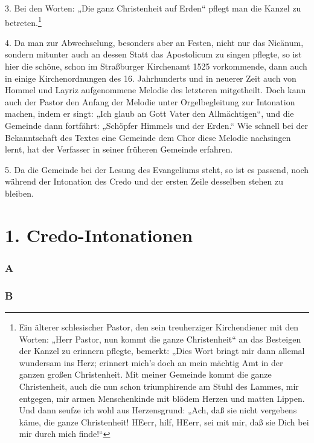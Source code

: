 3. Bei den Worten: „Die ganz Christenheit auf Erden“ pflegt man die Kanzel zu betreten.\footnote{Ein älterer schlesischer Pastor, den sein treuherziger Kirchendiener mit den Worten: „Herr Pastor, nun kommt die ganze Christenheit“ an das Besteigen der Kanzel zu erinnern pflegte, bemerkt: „Dies Wort bringt mir dann allemal wundersam ins Herz; erinnert mich’s doch an mein mächtig Amt in der ganzen großen Christenheit. Mit meiner Gemeinde kommt die ganze Christenheit, auch die nun schon triumphirende am Stuhl des Lammes, mir entgegen, mir armen Menschenkinde mit blödem Herzen und matten Lippen. Und dann seufze ich wohl aus Herzensgrund: „Ach, daß sie nicht vergebens käme, die ganze Christenheit! HEerr, hilf, HEerr, sei mit mir, daß sie Dich bei mir durch mich finde!“}

4. Da man zur Abwechselung, besonders aber an Festen, nicht nur das Nicänum, sondern mitunter auch an dessen Statt das Apostolicum zu singen pflegte, so ist hier die schöne, schon im Straßburger Kirchenamt 1525 vorkommende, dann auch in einige Kirchenordnungen des 16. Jahrhunderts und in neuerer Zeit auch von Hommel und Layriz aufgenommene Melodie des letzteren mitgetheilt. Doch kann auch der Pastor den Anfang der Melodie unter Orgelbegleitung zur Intonation machen, indem er singt: „Ich glaub an Gott Vater den Allmächtigen“, und die Gemeinde dann fortfährt: „Schöpfer Himmels und der Erden.“ Wie schnell bei der Bekanntschaft des Textes eine Gemeinde dem Chor diese Melodie nachsingen lernt, hat der Verfasser in seiner früheren Gemeinde erfahren.

5. Da die Gemeinde bei der Lesung des Evangeliums steht, so ist es passend, noch während der Intonation des Credo und der ersten Zeile desselben stehen zu bleiben.

\section{1. Credo-Intonationen}

\subsubsection{A}



\subsubsection{B}

